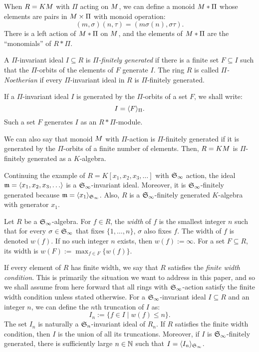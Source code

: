 When $R = KM$ with $\Pi$ acting on $M$, we can define a monoid $M *\Pi$ whose elements are pairs in $M \times \Pi$ with monoid operation:
 \[ (m, \sigma)(n, \tau) = (m\sigma(n), \sigma\tau). \]
There is a left action of $M*\Pi$ on $M$, and the elements of $M *\Pi$ are the ``monomials'' of $R*\Pi$.

\begin{definition}
 A $\Pi$-invariant ideal $I \subseteq R$ is {\em $\Pi$-finitely generated} if there is a finite set $F \subseteq I$ such that the $\Pi$-orbits of the elements of $F$ generate $I$.  The ring $R$ is called {\em $\Pi$-Noetherian} if every $\Pi$-invariant ideal in $R$ is $\Pi$-finitely generated.
\end{definition}
If a $\Pi$-invariant ideal $I$ is generated by the $\Pi$-orbits of a set $F$, we shall write:
 \[ I = \langle F \rangle_{\Pi}. \]
Such a set $F$ generates $I$ as an $R*\Pi$-module.

We can also say that monoid $M$ with $\Pi$-action is $\Pi$-finitely generated if it is generated by the $\Pi$-orbits of a finite number of elements.  Then, $R = KM$ is $\Pi$-finitely generated as a $K$-algebra.

\begin{example}
Continuing the example of $R = K[x_1,x_2,x_3,\ldots]$ with $\mathfrak S_\infty$ action, the ideal $\mathfrak m = \langle x_1,x_2,x_3,\ldots \rangle$ is a $\mathfrak S_\infty$-invariant ideal.  Moreover, it is $\mathfrak S_\infty$-finitely generated because $\mathfrak m = \langle x_1 \rangle_{\mathfrak S_\infty}$.  Also, $R$ is a $\mathfrak S_\infty$-finitely generated $K$-algebra with generator $x_1$.
\end{example}
 

\begin{definition}
 Let $R$ be a $\mathfrak S_\infty$-algebra.  For $f \in R$, the {\em width} of $f$ is the smallest integer $n$ such that for every $\sigma \in \mathfrak S_\infty$ that fixes $\{1,\ldots,n\}$, $\sigma$ also fixes $f$.  The width of $f$ is denoted $w(f)$.  If no such integer $n$ exists, then $w(f) := \infty$.  For a set $F \subseteq R$, its width is $w(F) := \max_{f \in F}\{w(f)\}$.
\end{definition}
If every element of $R$ has finite width, we say that $R$ satisfies the {\em finite width condition}.  This is primarily the situation we want to address in this paper, and so we shall assume from here forward that all rings with $\mathfrak S_\infty$-action satisfy the finite width condition unless stated otherwise.  For a $\mathfrak S_\infty$-invariant ideal $I \subseteq R$ and an integer $n$, we can define the $n$th truncation of $I$ as:
 \[ I_n := \{ f \in I \mid w(f) \leq n \}. \]
The set $I_n$ is naturally a $\mathfrak S_n$-invariant ideal of $R_n$.  If $R$ satisfies the finite width condition, then $I$ is the union of all its truncations.  Moreover, if $I$ is $\mathfrak S_\infty$-finitely generated, there is sufficiently large $n \in \mathbb N$ such that $I = \langle I_n \rangle_{\mathfrak S_\infty}$.

